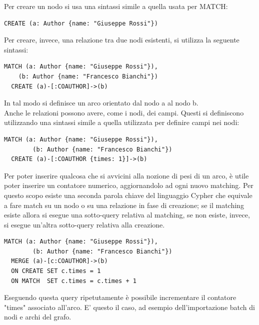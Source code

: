 \documentclass[a4paper, 12pt]{article}
\begin{document}
Per creare un nodo si usa una sintassi simile a quella usata per MATCH:
\begin{lstlisting}[keepspaces=true]
  CREATE (a: Author {name: "Giuseppe Rossi"})
\end{lstlisting}
Per creare, invece, una relazione tra due nodi esistenti, si utilizza la seguente sintassi:
\begin{lstlisting}[keepspaces=true]
  MATCH (a: Author {name: "Giuseppe Rossi"}),
    (b: Author {name: "Francesco Bianchi"})
  CREATE (a)-[:COAUTHOR]->(b)
\end{lstlisting}
In tal modo si definisce un arco orientato dal nodo a al nodo b. \\
Anche le relazioni possono avere, come i nodi, dei campi. Questi si definiscono utilizzando una sintassi simile a quella utilizzata per definire campi nei nodi:
\begin{lstlisting}[keepspaces=true]
  MATCH (a: Author {name: "Giuseppe Rossi"}),
        (b: Author {name: "Francesco Bianchi"})
  CREATE (a)-[:COAUTHOR {times: 1}]->(b)
\end{lstlisting}
Per poter inserire qualcosa che si avvicini alla nozione di pesi di un arco, è utile poter inserire un contatore numerico, aggiornandolo ad ogni nuovo matching.
Per questo scopo esiste una seconda parola chiave del linguaggio Cypher che equivale a fare match su un nodo o su una relazione in fase di creazione; se il matching esiste allora si esegue una sotto-query relativa al matching, se non esiste, invece, si esegue un'altra sotto-query relativa alla creazione.
\begin{lstlisting}[keepspaces=true]
  MATCH (a: Author {name: "Giuseppe Rossi"}),
        (b: Author {name: "Francesco Bianchi"})
  MERGE (a)-[c:COAUTHOR]->(b)
  ON CREATE SET c.times = 1
  ON MATCH  SET c.times = c.times + 1
\end{lstlisting}
Eseguendo questa query ripetutamente è possibile incrementare il contatore "times" associato all'arco. E' questo il caso, ad esempio dell'importazione batch di nodi e archi del grafo. \\
\end{document}
